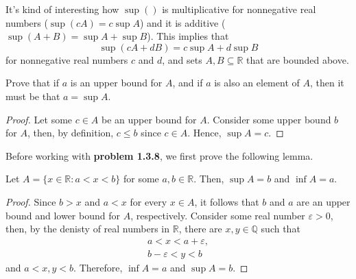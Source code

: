 \documentclass[12pt]{article}
\newcommand{\R}{\mathbb{R}}
\newcommand{\Q}{\mathbb{Q}}
\newenvironment{lemma}[2][Lemma]{\begin{trivlist}
		\item[\hskip \labelsep {\bfseries #1}\hskip \labelsep {\bfseries #2.}]}{\end{trivlist}}
\newenvironment{problem}[2][Problem]{\begin{trivlist}
		\item[\hskip \labelsep {\bfseries #1}\hskip \labelsep {\bfseries #2.}]}{\end{trivlist}}
\begin{document}
		It's kind of interesting how $\sup()$ is multiplicative for nonnegative real numbers ($\sup(cA) = c\sup A$) and it is additive ($\sup(A+B) = \sup A + \sup B$). This implies that 
		\begin{equation*} 
		\sup(cA+dB) = c\sup A + d\sup B
		\end{equation*}
		 for nonnegative real numbers $c$ and $d$, and sets $A,B\subseteq \R$ that are bounded above.
		\begin{problem}{1.3.7}
			Prove that if $a$ is an upper bound for $A$, and if $a$ is also an element of $A$, then it must be that $a=\sup A$.
			\begin{proof}
				Let some $c\in A$ be an upper bound for $A$. Consider some upper bound $b$ for $A$, then, by definition, $c\leq b$ since $c\in A$. Hence, $\sup A = c$.
			\end{proof}
		\end{problem}
		Before working with \textbf{problem 1.3.8}, we first prove the following lemma.
		\begin{lemma}{1.3.8}
			Let $A=\{x\in \R: a<x<b\}$ for some $a,b\in \R$. Then, $\sup A = b$ and $\inf A = a$.
			\begin{proof}
				Since $b> x$ and $a< x$ for every $x\in A$, it follows that $b$ and $a$ are an upper bound and lower bound for $A$, respectively. Consider some real number $\varepsilon > 0$, then, by the denisty of real numbers in $\R$, there are $x,y\in \Q$ such that
				\begin{align*}
					a<x<a+\varepsilon,\\
					b-\varepsilon<y<b
				\end{align*}
			and $a<x,y<b$. Therefore, $\inf A = a$ and $\sup A = b$.
			\end{proof}
		\end{lemma}
\end{document}
